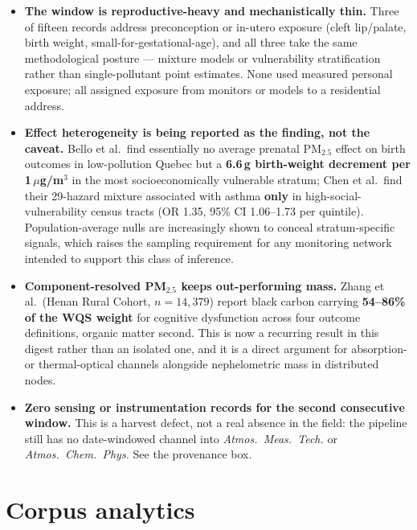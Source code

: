 \documentclass[10pt]{article}
\begin{document}
\footnotesize
\begin{itemize}
\item \textbf{The window is reproductive-heavy and mechanistically thin.} Three of
fifteen records address preconception or in-utero exposure (cleft lip/palate,
birth weight, small-for-gestational-age), and all three take the same methodological
posture --- mixture models or vulnerability stratification rather than single-pollutant
point estimates. None used measured personal exposure; all assigned exposure from
monitors or models to a residential address.

\item \textbf{Effect heterogeneity is being reported as the finding, not the caveat.}
Bello et al.\ find essentially no average prenatal PM$_{2.5}$ effect on birth outcomes in
low-pollution Quebec but a \textbf{6.6\,g birth-weight decrement per 1\,$\mu$g/m$^3$} in
the most socioeconomically vulnerable stratum; Chen et al.\ find their 29-hazard mixture
associated with asthma \textbf{only} in high-social-vulnerability census tracts
(OR 1.35, 95\% CI 1.06--1.73 per quintile). Population-average nulls are increasingly
shown to conceal stratum-specific signals, which raises the sampling requirement for any
monitoring network intended to support this class of inference.

\item \textbf{Component-resolved PM$_{2.5}$ keeps out-performing mass.} Zhang et al.\
(Henan Rural Cohort, $n = 14{,}379$) report black carbon carrying \textbf{54--86\% of the
WQS weight} for cognitive dysfunction across four outcome definitions, organic matter
second. This is now a recurring result in this digest rather than an isolated one, and it
is a direct argument for absorption- or thermal-optical channels alongside nephelometric
mass in distributed nodes.

\item \textbf{Zero sensing or instrumentation records for the second consecutive window.}
This is a harvest defect, not a real absence in the field: the pipeline still has no
date-windowed channel into \textit{Atmos.\ Meas.\ Tech.} or \textit{Atmos.\ Chem.\ Phys.}
See the provenance box.
\end{itemize}

\clearpage

\section*{\sffamily\bfseries\color{Deep}Corpus analytics}
\vspace{-1.5mm}{\color{Amber}\rule{\linewidth}{1.1pt}}\vspace{2.5mm}
\end{document}
